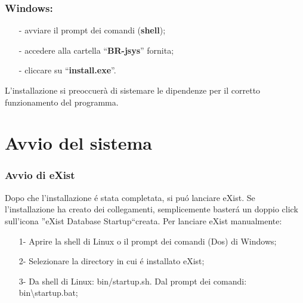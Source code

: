 \subsection{Windows:}
\begin{itemize} 
\item[-] avviare il prompt dei comandi (\textbf{shell});
\item[-] accedere alla cartella ``\textbf{BR-jsys}'' fornita;
\item[-] cliccare su ``\textbf{install.exe}''.
\end{itemize}
L'installazione si preoccuer\`a di sistemare le dipendenze per il corretto funzionamento del programma.



\chapter{Avvio del sistema}
\subsection{Avvio di eXist}
Dopo che l'installazione \'e stata completata, si pu\'o lanciare eXist. Se l'installazione ha creato dei collegamenti, semplicemente baster\'a un doppio click sull'icona ''eXist Database Startup``creata.
Per lanciare eXist manualmente:
\begin{itemize}
\item[1-] Aprire la shell di Linux o il prompt dei comandi (Dos) di Windows;
\item[2-] Selezionare la directory in cui \'e installato eXist;
\item[3-] Da shell di Linux: bin/startup.sh. Dal prompt dei comandi: bin\textbackslash startup.bat;
\end{itemize}	


